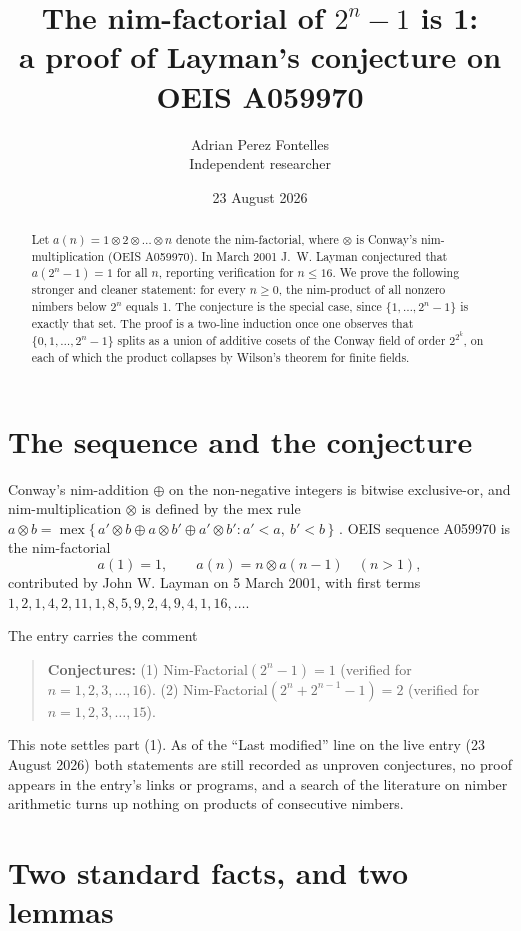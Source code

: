 \documentclass[11pt,a4paper]{article}
\title{The nim-factorial of $2^{n}-1$ is 1:\\
a proof of Layman's conjecture on OEIS A059970}
\author{Adrian Perez Fontelles\\ \small Independent researcher}
\date{23 August 2026}
\theoremstyle{plain}
\theoremstyle{definition}
\DeclareMathOperator{\mex}{mex}
\begin{document}
\maketitle

\begin{abstract}
Let $a(n)=1\otimes2\otimes\dots\otimes n$ denote the nim-factorial, where $\otimes$ is
Conway's nim-multiplication (OEIS A059970). In March 2001 J.~W. Layman conjectured that
$a(2^{n}-1)=1$ for all $n$, reporting verification for $n\le16$. We prove the following
stronger and cleaner statement: for every $n\ge0$, the nim-product of all nonzero nimbers
below $2^{n}$ equals 1. The conjecture is the special case, since $\{1,\dots,2^{n}-1\}$ is
exactly that set. The proof is a two-line induction once one observes that
$\{0,1,\dots,2^{n}-1\}$ splits as a union of additive cosets of the Conway field of order
$2^{2^{k}}$, on each of which the product collapses by Wilson's theorem for finite fields.
\end{abstract}

\section{The sequence and the conjecture}

Conway's nim-addition $\oplus$ on the non-negative integers is bitwise exclusive-or, and
nim-multiplication $\otimes$ is defined by the mex rule
$a\otimes b=\mex\{\,a'\otimes b\oplus a\otimes b'\oplus a'\otimes b' : a'<a,\ b'<b\,\}$
\cite[Ch.~6]{conway}. OEIS sequence A059970 is the nim-factorial
\[
  a(1)=1,\qquad a(n)=n\otimes a(n-1)\quad(n>1),
\]
contributed by John W. Layman on 5 March 2001, with first terms
$1,2,1,4,2,11,1,8,5,9,2,4,9,4,1,16,\dots$.

The entry carries the comment

\begin{quote}
\textbf{Conjectures:} (1) Nim-Factorial$(2^{n}-1)=1$ (verified for
$n=1,2,3,\dots,16$). (2) Nim-Factorial$(2^{n}+2^{n-1}-1)=2$ (verified for
$n=1,2,3,\dots,15$).
\end{quote}

This note settles part (1). As of the ``Last modified'' line on the live entry (23 August
2026) both statements are still recorded as unproven conjectures, no proof appears in the
entry's links or programs, and a search of the literature on nimber arithmetic turns up
nothing on products of consecutive nimbers.

\section{Two standard facts, and two lemmas}
\end{document}
